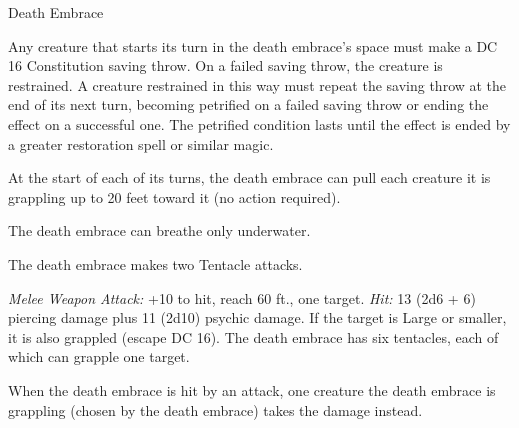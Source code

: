 \documentclass[10pt,a4paper,twoside,bg=none,twocolumn,openany,nodeprecatedcode]{dndbook}
\begin{document}
\begin{DndMonster}[float=t]{Death Embrace}
\DndMonsterBasics[
armor-class = {13 (natural armor)},
hit-points = {\DndDice{14d12 + 56}},
speed = {0 ft., swim 20 ft.}
]
\DndMonsterAbilityScores[
 str = 23,
 dex = 15,
 con = 19,
 int = 6,
 wis = 9,
 cha = 4
]
\DndMonsterDetails[
saving-throws = {Str +10, Wis +3},
senses = {blindsight 60 ft. (blind beyond this radius), passive perception 9},
challenge = 11,
]
Any creature that starts its turn in the death embrace's space must make a DC 16 Constitution saving throw. On a failed saving throw, the creature is restrained. A creature restrained in this way must repeat the saving throw at the end of its next turn, becoming petrified on a failed saving throw or ending the effect on a successful one. The petrified condition lasts until the effect is ended by a greater restoration spell or similar magic.

At the start of each of its turns, the death embrace can pull each creature it is grappling up to 20 feet toward it (no action required).

The death embrace can breathe only underwater.

\par
{}
The death embrace makes two Tentacle attacks.

\textsl{Melee Weapon Attack:} +10 to hit, reach 60 ft., one target. \textsl{Hit:} 13 (2d6 + 6) piercing damage plus 11 (2d10) psychic damage. If the target is Large or smaller, it is also grappled (escape DC 16). The death embrace has six tentacles, each of which can grapple one target.

\par
{}
When the death embrace is hit by an attack, one creature the death embrace is grappling (chosen by the death embrace) takes the damage instead.

\end{DndMonster}
\end{document}
